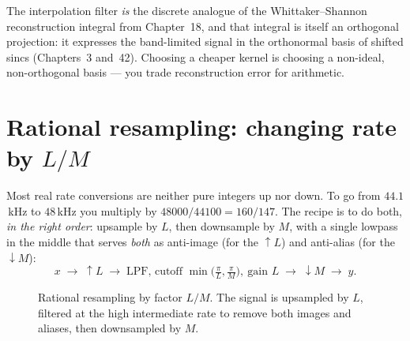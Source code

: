 \begin{connectionbox}
The interpolation filter \emph{is} the discrete analogue of the
Whittaker--Shannon reconstruction integral from Chapter~18, and that
integral is itself an orthogonal projection: it expresses the band-limited signal in the
orthonormal basis of shifted sincs (Chapters~3 and~42).
Choosing a cheaper kernel is choosing a non-ideal, non-orthogonal basis --- you
trade reconstruction error for arithmetic.
\end{connectionbox}

\section{Rational resampling: changing rate by $L/M$}
\label{ch22:rational}

Most real rate conversions are neither pure integers up nor down. To go from
$44.1$\,kHz to $48$\,kHz you multiply by $48000/44100 = 160/147$. The recipe is to
do both, \emph{in the right order}: upsample by $L$, then downsample by $M$, with
a single lowpass in the middle that serves \emph{both} as anti-image (for the
$\uparrow L$) and anti-alias (for the $\downarrow M$):
\begin{equation}
  x \;\to\; \boxed{\uparrow L} \;\to\;
  \boxed{\text{LPF, cutoff } \min\!\big(\tfrac{\pi}{L},\tfrac{\pi}{M}\big),\
  \text{gain } L} \;\to\; \boxed{\downarrow M} \;\to\; y.
  \label{ch22:ratchain}
\end{equation}

\begin{figure}[htbp]
\centering
{}
\caption{Rational resampling by factor $L/M$. The signal is upsampled by $L$, filtered at the high intermediate rate to remove both images and aliases, then downsampled by $M$.}
\label{ch22:fig-rational}
\end{figure}

